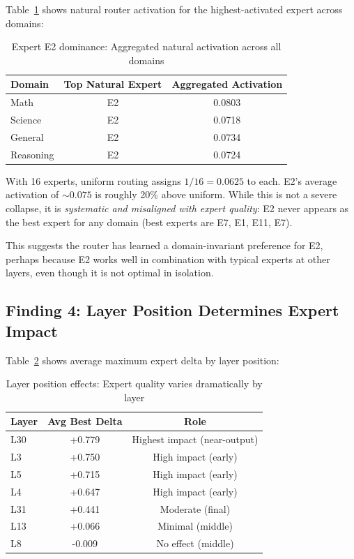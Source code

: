 \documentclass[11pt,a4paper]{article}
\begin{document}
Table~\ref{tab:e2_dominance} shows natural router activation for the highest-activated expert across domains:

\begin{table}[h]
\centering
\caption{Expert E2 dominance: Aggregated natural activation across all domains}
\label{tab:e2_dominance}
\begin{tabular}{lcc}
\toprule
\textbf{Domain} & \textbf{Top Natural Expert} & \textbf{Aggregated Activation} \\
\midrule
Math & E2 & 0.0803 \\
Science & E2 & 0.0718 \\
General & E2 & 0.0734 \\
Reasoning & E2 & 0.0724 \\
\bottomrule
\end{tabular}
\end{table}

With 16 experts, uniform routing assigns $1/16 = 0.0625$ to each. E2's average activation of $\sim 0.075$ is roughly 20\% above uniform. While this is not a severe collapse, it is \textit{systematic and misaligned with expert quality}: E2 never appears as the best expert for any domain (best experts are E7, E1, E11, E7).

This suggests the router has learned a domain-invariant preference for E2, perhaps because E2 works well in combination with typical experts at other layers, even though it is not optimal in isolation.

\subsection{Finding 4: Layer Position Determines Expert Impact}

Table~\ref{tab:layer_importance} shows average maximum expert delta by layer position:

\begin{table}[h]
\centering
\caption{Layer position effects: Expert quality varies dramatically by layer}
\label{tab:layer_importance}
\begin{tabular}{lcc}
\toprule
\textbf{Layer} & \textbf{Avg Best Delta} & \textbf{Role} \\
\midrule
L30 & +0.779 & Highest impact (near-output) \\
L3 & +0.750 & High impact (early) \\
L5 & +0.715 & High impact (early) \\
L4 & +0.647 & High impact (early) \\
L31 & +0.441 & Moderate (final) \\
L13 & +0.066 & Minimal (middle) \\
L8 & -0.009 & No effect (middle) \\
\bottomrule
\end{tabular}
\end{table}
\end{document}
